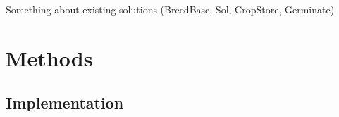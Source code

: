 \documentclass[12pt,a4paper]{extarticle}
\begin{document}
Something about existing solutions (BreedBase, Sol, CropStore, Germinate)





\section*{Methods}%
















\subsection*{Implementation}
\end{document}
